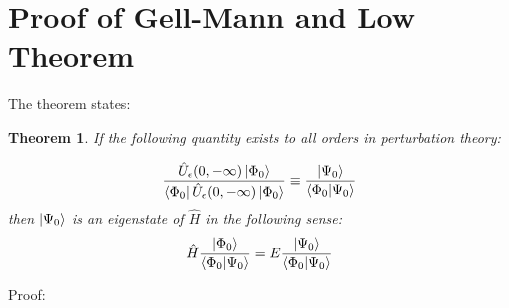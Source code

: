 \documentclass{article}
\numberwithin{equation}{subsection} %
\newtheorem{thm}{Theorem}
\begin{document}
%	
%	
%
%
%
%	
%	
%	
%	

\appendix %

\section{Proof of Gell-Mann and Low Theorem}
\label{appendix:Proof_of_G-M_Low}
The theorem states:

\begin{thm}
	If the following quantity exists to all orders in perturbation theory:
	
	$$ \frac{\hat{U}_\epsilon(0,-\infty)\ket{\Phi_0}}{\bra{\Phi_0}\hat{U}_\epsilon(0,-\infty)\ket{\Phi_0}}
	\equiv
	\frac{\ket{\Psi_0}}{\braket{\Phi_0|\Psi_0}}
	$$
	then $\ket{\Psi_0}$ is an eigenstate of $\hat{H}$ in the following sense:
	$$\hat{H}\frac{\ket{\Phi_0}}{\braket{\Phi_0|\Psi_0}}
	=
	E \frac{\ket{\Psi_0}}{\braket{\Phi_0 |\Psi_0}}
	$$
\end{thm}

Proof:
\end{document}
